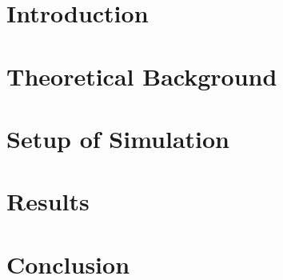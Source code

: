 \documentclass[a4paper,10pt,twoside,ngerman,bibliography=totoc]{scrreprt}
\begin{document}
	\mathswapoff                 %

	\graphicspath{{pics/}{pics/logos/}{pics/diagrams/}{pics/plots/}}
	\pagestyle{empty}
	
	\cleardoublepage
	\cleardoublepage
	
	\cleardoublepage
	
	\pagestyle{plain}
	\vspace*{-2cm} 
	\tableofcontents
	\cleardoublepage
	
	
	\cleardoublepage
	\pagestyle{scrheadings}
	\chapter{Introduction}
	
	\chapter{Theoretical Background}
	
	
	
	
	\chapter{Setup of Simulation}
	
	
	\chapter{Results}
	
	
	\chapter{Conclusion}
	\clearpage
	\renewcommand{\bibname}{Bibliography}
	\printbibliography
	\cleardoublepage
	\appendix
	
	
\end{document}
